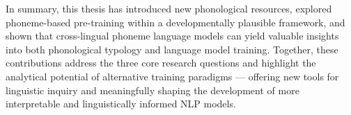 In summary, this thesis has introduced new phonological resources, explored phoneme-based pre-training within a developmentally plausible framework, and shown that cross-lingual phoneme language models can yield valuable insights into both phonological typology and language model training. Together, these contributions address the three core research questions and highlight the analytical potential of alternative training paradigms --- offering new tools for linguistic inquiry and meaningfully shaping the development of more interpretable and linguistically informed NLP models.







